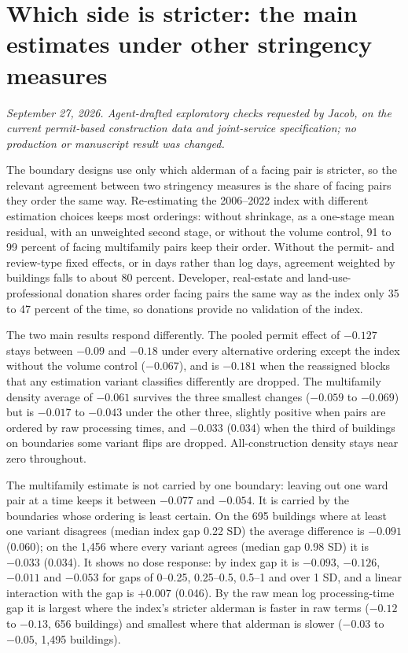 \clearpage
\section*{Which side is stricter: the main estimates under other stringency measures}
\textit{September 27, 2026. Agent-drafted exploratory checks requested by Jacob, on the current permit-based
construction data and joint-service specification; no production or manuscript result was changed.}

The boundary designs use only which alderman of a facing pair is stricter, so the relevant agreement between two
stringency measures is the share of facing pairs they order the same way. Re-estimating the 2006--2022 index with
different estimation choices keeps most orderings: without shrinkage, as a one-stage mean residual, with an
unweighted second stage, or without the volume control, 91 to 99 percent of facing multifamily pairs keep their
order. Without the permit- and review-type fixed effects, or in days rather than log days, agreement weighted by
buildings falls to about 80 percent. Developer, real-estate and land-use-professional donation shares order facing
pairs the same way as the index only 35 to 47 percent of the time, so donations provide no validation of the index.

The two main results respond differently. The pooled permit effect of $-0.127$ stays between $-0.09$ and $-0.18$
under every alternative ordering except the index without the volume control ($-0.067$), and is $-0.181$ when the
reassigned blocks that any estimation variant classifies differently are dropped. The multifamily density average of
$-0.061$ survives the three smallest changes ($-0.059$ to $-0.069$) but is $-0.017$ to $-0.043$ under the other
three, slightly positive when pairs are ordered by raw processing times, and $-0.033$ (0.034) when the third of
buildings on boundaries some variant flips are dropped. All-construction density stays near zero throughout.

The multifamily estimate is not carried by one boundary: leaving out one ward pair at a time keeps it between
$-0.077$ and $-0.054$. It is carried by the boundaries whose ordering is least certain. On the 695 buildings where at
least one variant disagrees (median index gap 0.22 SD) the average difference is $-0.091$ (0.060); on the 1,456
where every variant agrees (median gap 0.98 SD) it is $-0.033$ (0.034). It shows no dose response: by index gap it is
$-0.093$, $-0.126$, $-0.011$ and $-0.053$ for gaps of 0--0.25, 0.25--0.5, 0.5--1 and over 1 SD, and a linear
interaction with the gap is $+0.007$ (0.046). By the raw mean log processing-time gap it is largest where the index's
stricter alderman is faster in raw terms ($-0.12$ to $-0.13$, 656 buildings) and smallest where that alderman is
slower ($-0.03$ to $-0.05$, 1,495 buildings).

